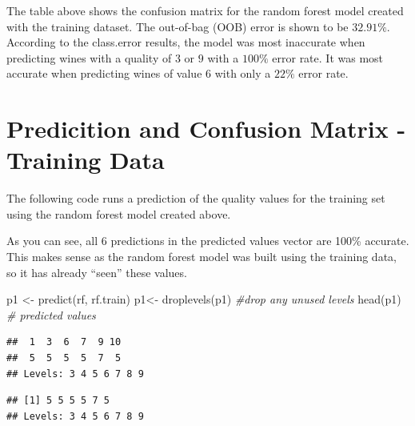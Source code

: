 \documentclass[
]{book}
\newenvironment{Shaded}{\begin{snugshade}}{\end{snugshade}}
\newcommand{\CommentTok}[1]{\textcolor[rgb]{0.56,0.35,0.01}{\textit{#1}}}
\newcommand{\FunctionTok}[1]{\textcolor[rgb]{0.00,0.00,0.00}{#1}}
\newcommand{\NormalTok}[1]{#1}
\newcommand{\OtherTok}[1]{\textcolor[rgb]{0.56,0.35,0.01}{#1}}
\newcommand{\SpecialCharTok}[1]{\textcolor[rgb]{0.00,0.00,0.00}{#1}}
\begin{document}
The table above shows the confusion matrix for the random forest model created with the training dataset. The out-of-bag (OOB) error is shown to be \(32.91\%\). According to the class.error results, the model was most inaccurate when predicting wines with a quality of \(3\) or \(9\) with a \(100\%\) error rate. It was most accurate when predicting wines of value 6 with only a \(22\%\) error rate.

\hypertarget{predicition-and-confusion-matrix---training-data}{%
\section{Predicition and Confusion Matrix - Training Data}\label{predicition-and-confusion-matrix---training-data}}

The following code runs a prediction of the quality values for the training set using the random forest model created above.

As you can see, all 6 predictions in the predicted values vector are 100\% accurate. This makes sense as the random forest model was built using the training data, so it has already ``seen'' these values.

\begin{Shaded}
\begin{Highlighting}[]
\NormalTok{p1 }\OtherTok{\textless{}{-}} \FunctionTok{predict}\NormalTok{(rf, rf.train)}
\NormalTok{p1}\OtherTok{\textless{}{-}} \FunctionTok{droplevels}\NormalTok{(p1) }\CommentTok{\#drop any unused levels}
\FunctionTok{head}\NormalTok{(p1) }\CommentTok{\# predicted values}
\end{Highlighting}
\end{Shaded}

\begin{verbatim}
##  1  3  6  7  9 10 
##  5  5  5  5  7  5 
## Levels: 3 4 5 6 7 8 9
\end{verbatim}

\begin{Shaded}
\end{Shaded}

\begin{verbatim}
## [1] 5 5 5 5 7 5
## Levels: 3 4 5 6 7 8 9
\end{verbatim}

\begin{Shaded}
\end{Shaded}
\end{document}
